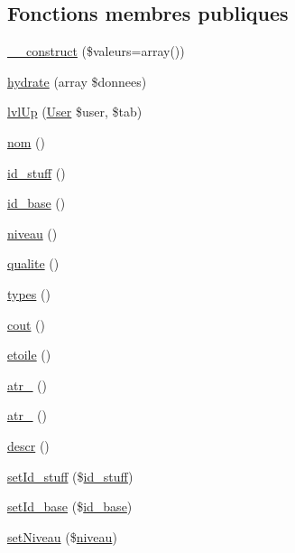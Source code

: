 \subsection*{Fonctions membres publiques}
\begin{DoxyCompactItemize}
\item 
\mbox{\hyperlink{class_stuff_a85fa1bd0e8d0c382a2860f32ae2dfb1d}{\+\_\+\+\_\+construct}} (\$valeurs=array())
\item 
\mbox{\hyperlink{class_stuff_af51c6e71896e65dd76820cd733b5f274}{hydrate}} (array \$donnees)
\item 
\mbox{\hyperlink{class_stuff_a58df203bb30ef856eab931a8b363ee69}{lvl\+Up}} (\mbox{\hyperlink{class_user}{User}} \$user, \$tab)
\item 
\mbox{\hyperlink{class_stuff_a38d4592ddc6ed1f09868ea5b7a82fdb9}{nom}} ()
\item 
\mbox{\hyperlink{class_stuff_afa98c482eb21f0fa990545bdb0b66dba}{id\+\_\+stuff}} ()
\item 
\mbox{\hyperlink{class_stuff_a3f05761c8833bcb9f25dac07605f54e8}{id\+\_\+base}} ()
\item 
\mbox{\hyperlink{class_stuff_a4d8664e6878c9661e0d0dcf46b1bd5d6}{niveau}} ()
\item 
\mbox{\hyperlink{class_stuff_a30e7d02611dc95bd7481781e503f575d}{qualite}} ()
\item 
\mbox{\hyperlink{class_stuff_a31db818ab10befbdba9c8d24d62dbb90}{types}} ()
\item 
\mbox{\hyperlink{class_stuff_a3a67cfe36aa054dfc42f99a6883bb408}{cout}} ()
\item 
\mbox{\hyperlink{class_stuff_a60e42cc89da2a51716a685ad1cbe8b44}{etoile}} ()
\item 
\mbox{\hyperlink{class_stuff_a4afe7d4f33396df453f6fdc9c0ba3aa5}{atr\+\_}} ()
\item 
\mbox{\hyperlink{class_stuff_a1bb01959da153fe1aacf0b3fe5454756}{atr\+\_}} ()
\item 
\mbox{\hyperlink{class_stuff_a1b91ba84e3eb06abc49dc61810f97454}{descr}} ()
\item 
\mbox{\hyperlink{class_stuff_ab06c44c241a0322978a44dffabac731d}{set\+Id\+\_\+stuff}} (\$\mbox{\hyperlink{class_stuff_afa98c482eb21f0fa990545bdb0b66dba}{id\+\_\+stuff}})
\item 
\mbox{\hyperlink{class_stuff_a47eed0620503b4e4aba2b445531b598a}{set\+Id\+\_\+base}} (\$\mbox{\hyperlink{class_stuff_a3f05761c8833bcb9f25dac07605f54e8}{id\+\_\+base}})
\item 
\mbox{\hyperlink{class_stuff_ad30226d936b128c511c6af7b542d8966}{set\+Niveau}} (\$\mbox{\hyperlink{class_stuff_a4d8664e6878c9661e0d0dcf46b1bd5d6}{niveau}})

\end{DoxyCompactItemize}
